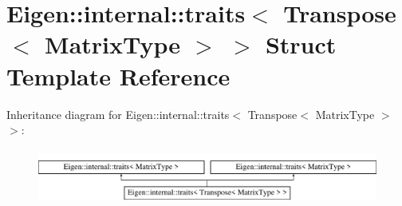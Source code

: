 \hypertarget{struct_eigen_1_1internal_1_1traits_3_01_transpose_3_01_matrix_type_01_4_01_4}{}\section{Eigen\+:\+:internal\+:\+:traits$<$ Transpose$<$ Matrix\+Type $>$ $>$ Struct Template Reference}
\label{struct_eigen_1_1internal_1_1traits_3_01_transpose_3_01_matrix_type_01_4_01_4}
Inheritance diagram for Eigen\+:\+:internal\+:\+:traits$<$ Transpose$<$ Matrix\+Type $>$ $>$\+:\begin{figure}[H]
\begin{center}
\leavevmode
\includegraphics[height=1.848185cm]{struct_eigen_1_1internal_1_1traits_3_01_transpose_3_01_matrix_type_01_4_01_4}
\end{center}
\end{figure}

